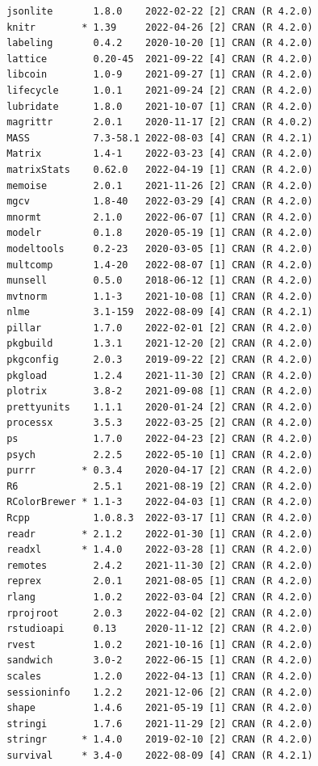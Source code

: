\documentclass[oneside, 10pt]{book}\usepackage[]{graphicx}\usepackage[]{xcolor}
\makeatletter
\newenvironment{kframe}{%
 \def\at@end@of@kframe{}%
 \ifinner\ifhmode%
  \def\at@end@of@kframe{\end{minipage}}%
  \begin{minipage}{\columnwidth}%
 \fi\fi%
 \def\FrameCommand##1{\hskip\@totalleftmargin \hskip-\fboxsep
 \colorbox{shadecolor}{##1}\hskip-\fboxsep
     \hskip-\linewidth \hskip-\@totalleftmargin \hskip\columnwidth}%
 \MakeFramed {\advance\hsize-\width
   \@totalleftmargin\z@ \linewidth\hsize
   \@setminipage}}%
 {\par\unskip\endMakeFramed%
 \at@end@of@kframe}
\newenvironment{knitrout}{}{} %
\makeatother
\begin{document}
\begin{knitrout}
\begin{kframe}
\begin{verbatim}
 jsonlite       1.8.0    2022-02-22 [2] CRAN (R 4.2.0)
 knitr        * 1.39     2022-04-26 [2] CRAN (R 4.2.0)
 labeling       0.4.2    2020-10-20 [1] CRAN (R 4.2.0)
 lattice        0.20-45  2021-09-22 [4] CRAN (R 4.2.0)
 libcoin        1.0-9    2021-09-27 [1] CRAN (R 4.2.0)
 lifecycle      1.0.1    2021-09-24 [2] CRAN (R 4.2.0)
 lubridate      1.8.0    2021-10-07 [1] CRAN (R 4.2.0)
 magrittr       2.0.1    2020-11-17 [2] CRAN (R 4.0.2)
 MASS           7.3-58.1 2022-08-03 [4] CRAN (R 4.2.1)
 Matrix         1.4-1    2022-03-23 [4] CRAN (R 4.2.0)
 matrixStats    0.62.0   2022-04-19 [1] CRAN (R 4.2.0)
 memoise        2.0.1    2021-11-26 [2] CRAN (R 4.2.0)
 mgcv           1.8-40   2022-03-29 [4] CRAN (R 4.2.0)
 mnormt         2.1.0    2022-06-07 [1] CRAN (R 4.2.0)
 modelr         0.1.8    2020-05-19 [1] CRAN (R 4.2.0)
 modeltools     0.2-23   2020-03-05 [1] CRAN (R 4.2.0)
 multcomp       1.4-20   2022-08-07 [1] CRAN (R 4.2.0)
 munsell        0.5.0    2018-06-12 [1] CRAN (R 4.2.0)
 mvtnorm        1.1-3    2021-10-08 [1] CRAN (R 4.2.0)
 nlme           3.1-159  2022-08-09 [4] CRAN (R 4.2.1)
 pillar         1.7.0    2022-02-01 [2] CRAN (R 4.2.0)
 pkgbuild       1.3.1    2021-12-20 [2] CRAN (R 4.2.0)
 pkgconfig      2.0.3    2019-09-22 [2] CRAN (R 4.2.0)
 pkgload        1.2.4    2021-11-30 [2] CRAN (R 4.2.0)
 plotrix        3.8-2    2021-09-08 [1] CRAN (R 4.2.0)
 prettyunits    1.1.1    2020-01-24 [2] CRAN (R 4.2.0)
 processx       3.5.3    2022-03-25 [2] CRAN (R 4.2.0)
 ps             1.7.0    2022-04-23 [2] CRAN (R 4.2.0)
 psych          2.2.5    2022-05-10 [1] CRAN (R 4.2.0)
 purrr        * 0.3.4    2020-04-17 [2] CRAN (R 4.2.0)
 R6             2.5.1    2021-08-19 [2] CRAN (R 4.2.0)
 RColorBrewer * 1.1-3    2022-04-03 [1] CRAN (R 4.2.0)
 Rcpp           1.0.8.3  2022-03-17 [1] CRAN (R 4.2.0)
 readr        * 2.1.2    2022-01-30 [1] CRAN (R 4.2.0)
 readxl       * 1.4.0    2022-03-28 [1] CRAN (R 4.2.0)
 remotes        2.4.2    2021-11-30 [2] CRAN (R 4.2.0)
 reprex         2.0.1    2021-08-05 [1] CRAN (R 4.2.0)
 rlang          1.0.2    2022-03-04 [2] CRAN (R 4.2.0)
 rprojroot      2.0.3    2022-04-02 [2] CRAN (R 4.2.0)
 rstudioapi     0.13     2020-11-12 [2] CRAN (R 4.2.0)
 rvest          1.0.2    2021-10-16 [1] CRAN (R 4.2.0)
 sandwich       3.0-2    2022-06-15 [1] CRAN (R 4.2.0)
 scales         1.2.0    2022-04-13 [1] CRAN (R 4.2.0)
 sessioninfo    1.2.2    2021-12-06 [2] CRAN (R 4.2.0)
 shape          1.4.6    2021-05-19 [1] CRAN (R 4.2.0)
 stringi        1.7.6    2021-11-29 [2] CRAN (R 4.2.0)
 stringr      * 1.4.0    2019-02-10 [2] CRAN (R 4.2.0)
 survival     * 3.4-0    2022-08-09 [4] CRAN (R 4.2.1)

\end{verbatim}
\end{kframe}
\end{knitrout}
\end{document}
